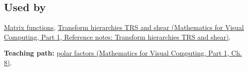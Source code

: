 \subsection{Used by}\label{appendix-73f5bcf7a462-used-by}

\hypertarget{appendix-73f5bcf7a462-used-by}{}

\hyperref[appendix-0f4bc2bf2b1f]{Matrix functions}, \href{../02-Mathematics-for-Visual-Computing-P01/main.pdf\#appendix-292c061cd47c}{Transform hierarchies TRS and shear (Mathematics for Visual Computing, Part 1, Reference notes: Transform hierarchies TRS and shear)}.

\textbf{Teaching path:} \href{../02-Mathematics-for-Visual-Computing-P01/main.pdf\#02-foundations-ii-ch024-polar-decomposition-separates-rotation-like-motion-from-stretch}{polar factors (Mathematics for Visual Computing, Part 1, Ch. 8)}.
